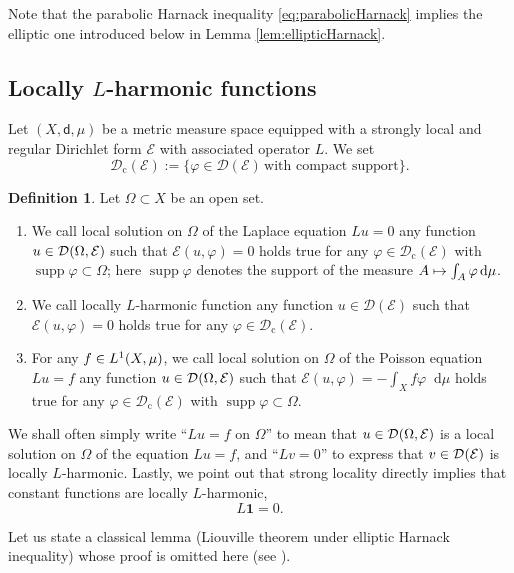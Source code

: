 \documentclass[JEP,XML,SOM,Unicode,published]{cedram}
\newcommand\mto{\mathchoice{\longmapsto}{\mapsto}{\mapsto}{\mapsto}}
\newcommand{\rmc}{\mathrm{c}}
\newcommand{\NoChangel}[1]{%
\expandafter\let\csname old\string#1\endcsname=#1
\let#1=\relax
\newcommand{#1}{\mathcode`l="716C\csname old\string#1\endcsname\mathcode`l="7160 }%
}
\theoremstyle{plain}
\theoremstyle{definition}
\newtheorem{definition}[theorem]{Definition}
\newcommand{\cE}{\mathcal{E}}
\newcommand{\cD}{\mathcal{D}}
\let\phi\varphi
\newcommand{\di}{\mathop{}\!\mathrm{d}}
\newcommand{\loc}{\mathrm{loc}}\NoChangel{\loc}
\DeclareMathOperator{\supp}{supp}
\newcommand{\dist}{\mathsf{d}}
\begin{document}
Note that the parabolic Harnack inequality \eqref{eq:parabolicHarnack} implies the elliptic one introduced below in Lemma \ref{lem:ellipticHarnack}.

\subsection*{Locally $L$-harmonic functions}

Let $(X,\dist,\mu)$ be a metric measure space equipped with a strongly local and regular Dirichlet form $\cE$ with associated operator $L$. We set
\[
\cD_\rmc(\cE):=\{ \phi \in \cD(\cE) \, \text{with compact support}\}.
\]

\begin{definition}\label{def:localsol} Let $\Omega \subset X$ be an open set.

\begin{enumerate}
\item
We call local solution on $\Omega$ of the Laplace equation $Lu=0$ any function $u \in \cD_{\loc}(\Omega,\cE)$ such that $\cE(u,\phi)=0$ holds true for any $\phi \in \cD_\rmc(\cE)$ with $\supp \phi \subset \Omega$; here $\supp \phi$ denotes the support of the measure $A \mto \int_A \phi \di \mu$.

\item
We call locally $L$-harmonic function any function $u \in \cD(\cE)$ such that $\cE(u,\phi)=0$ holds true for any $\phi \in \cD_\rmc(\cE)$.

\item
For any $f \in L^1_{\loc}(X,\mu)$, we call local solution on $\Omega$ of the Poisson equation $Lu=f$ any function $u \in \cD_{\loc}(\Omega, \cE)$ such that $\cE(u,\phi)=-\int_X f \phi \di \mu$ holds true for any $\phi \in \cD_\rmc(\cE)$ with $\supp \phi \subset \Omega$.
\end{enumerate}
\end{definition}

We shall often simply write ``$Lu=f$ on $\Omega$'' to mean that $u \in \cD_{\loc}(\Omega, \cE)$ is a local solution on $\Omega$ of the equation $Lu=f$, and ``$Lv=0$'' to express that $v \in \cD_{\loc}(\cE)$ is locally $L$-harmonic. Lastly, we point out that strong locality directly implies that constant functions are locally $L$-harmonic, \ie
\[
L\mathbf{1}=0.
\]

Let us state a classical lemma (Liouville theorem under elliptic Harnack inequality) whose proof is omitted here (see \eg \cite[Lem.\,7.3]{AldanaCarronTapie}).
\end{document}

